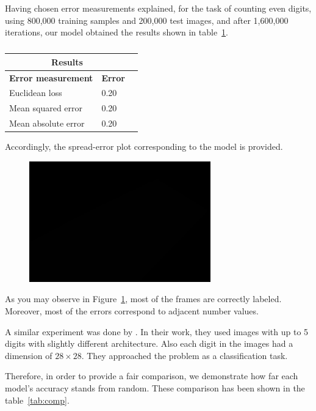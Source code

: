 \noindent Having chosen error measurements explained, for the task of counting even digits, using 800,000 training samples and 200,000 test images, and after 1,600,000 iterations, our model obtained the results shown in table~\ref{tab:res}.


\begin{table}[H]
\centering
\small\sffamily
\begin{tabular}{llr}
\multicolumn{2}{c}{\textbf{\textbf{Results}}} \\
\bottomrule
\textbf{Error measurement}        & \textbf{Error} \\
\bottomrule
Euclidean loss           & 0.20  \\
Mean squared error       & 0.20  \\
Mean absolute error      & 0.20  \\
\bottomrule
\end{tabular}
\caption{}
\label{tab:res}
\end{table} 

Accordingly, the spread-error plot corresponding to the model is provided.

\begin{figure}[H]
	\centering
	{\includegraphics[width=0.7\textwidth]{images/1}}
	\caption{}
	\label{fig:splot}
\end{figure}

As you may observe in Figure~\ref{fig:splot}, most
of the frames are correctly labeled. Moreover, most of the errors correspond to adjacent number values.

\noindent A similar experiment was done by \citeauthor*{segui2015learning}. In their work, they used images with up to 5 digits with slightly different architecture. Also each digit in the images had a dimension of $28\times28$. They approached the problem as a classification task. 

\indent Therefore, in order to provide a fair comparison, we demonstrate how far each model's accuracy stands from random. These comparison has been shown in the table~\ref{tab:comp}.

